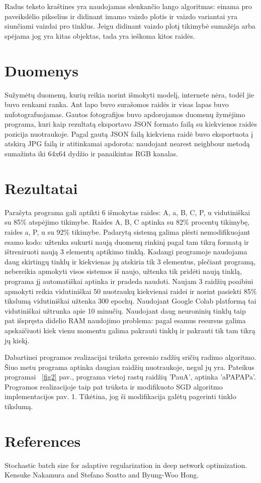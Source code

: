 \documentclass[conference]{IEEEtran}
\begin{document}
\par
Radus teksto kraštines yra naudojamas slenkančio lango algoritmas: einama
pro paveikslėlio pikselius ir didinant imamo vaizdo plotis ir vaizdo variantai yra
 siunčiami vaizdai pro
tinklus. Jeigu didinant vaizdo plotį tikimybė sumažėja arba spėjama jog yra kitas
objektas, tada yra ieškoma kitos raidės.

\section{Duomenys}

Sužymėtų duomenų, kurių reikia norint išmokyti modelį, internete nėra, todėl
jie buvo renkami ranka. Ant lapo buvo surašomos raidės ir visas lapas buvo
nufotografuojamas. Gautos fotografijos buvo apdorojamos duomenų žymėjimo programa,
kuri kaip rezultatą eksportavo JSON formato failą su kiekvienos raidės pozicija
nuotraukoje. Pagal gautą JSON failą kiekviena raidė buvo eksportuota į atskirą JPG
failą ir atitinkamai apdorota: naudojant nearest neighbour metodą sumažinta iki
64x64 dydžio ir panaikintas RGB kanalas.

\section{Rezultatai}

Parašyta programa gali aptikti 6 išmokytas raides: A, a, B, C, P, u vidutiniškai su
85\% atspėjimo tikimybe. Raides A, B, C aptinka su 82\% procentų tikimybę, raides a, P, u
su 92\% tikimybe. Padarytą sistemą galima plėsti nemodifikuojant esamo kodo:
užtenka sukurti naują duomenų rinkinį pagal tam tikrą formatą ir ištreniruoti naują
3 elementų aptikimo tinklą. Kadangi programoje naudojama daug skirtingų tinklų ir kiekvienas
jų atskiria tik 3 elementus, plečiant programą, nebereikia apmokyti visos sistemos iš naujo,
užtenka tik pridėti naują tinklą, programa jį automatiškai aptinka ir pradeda naudoti.
Naujam 3 raidžių poaibiui apmokyti reikia vidutiniškai 50 nuotraukų kiekvienai raidei ir
norint pasiekti 85\% tikslumą vidutiniškai užtenka 300 epochų. Naudojant Google Colab
platformą tai vidutiniškai užtrunka apie 10 minučių. Naudojant daug neuroninių tinklų
taip pat išspręsta didelio RAM naudojimo problema: pagal esamus resursus galima
apskaičiuoti kiek vienu momentu galima pakrauti tinklų ir pakrauti tik tam tikrą jų
kiekį.
\par
Dabartinei programos realizacijai trūksta geresnio radžių sričių radimo algoritmo.
Šiuo metu programa aptinka daugiau raidžių nuotraukoje, negul jų yra. Pateikus
programai ~\ref{fig2} pav., programa vietoj rastų raidžių 'PauA', aptinka 'aPAPAPa'.
Programos realizacijoje taip pat trūksta ir modifikuoto SGD algoritmo implementacijos pav. 1. Tikėtina, jog ši modifikacija galėtų pagerinti
tinklo tikslumą.

\printbibliography

\section{References}
\par
[1] Stochastic batch size for adaptive regularization in deep network optimization. Kensuke Nakamura and Stefano Soatto and Byung-Woo Hong. 
\end{document}
